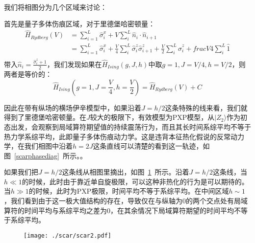 我们将相图分为几个区域来讨论：

首先是量子多体伤痕区域，对于里德堡哈密顿量：
\begin{equation}
\begin{split}
	\hat{H}_{Rydberg}(V) &= \sum_{i=1}^{L} \hat{\sigma}_{i}^{x} + V \sum_{i}^{L} \hat{n}_i\cdot\hat{n}_{i+1} \\
	\quad &= \sum_{i=1}^{L} \hat{\sigma}_{i}^{x} + \frac{V}{4}  \sum_{i}^L \hat{\sigma}_i^z\hat{\sigma}_{i+1}^z + \frac{V}{2} \sum_i^L \hat{\sigma}_i^z  + frac{V}{4} \sum_i^L \hat{1} \\
\end{split}
\end{equation}
带入$\hat{n}_i = \frac{\hat{\sigma}_i^z+1}{2}$，我们发现如果在$\hat{H}_{Ising}(g,J,h)$中取$g=1,J=V/4,h=V/2$，则两者是等价的：
\begin{equation}
\hat{H}_{Ising}(g=1,J=\frac{V}{4},h=\frac{V}{2}) = \hat{H}_{Rydberg}(V) + C
\end{equation}

因此在带有纵场的横场伊辛模型中，如果沿着$J=h/2$这条特殊的线来看，我们就得到了里德堡哈密顿量。在$J$较大的极限下，有效模型为PXP模型，从$|Z_2\rangle$作为初态出发，会观察到局域算符期望值的持续震荡行为，而且其长时间系综平均不等于热力学系综平均，此即量子多体伤痕动力学。这是违背本征热化假说的反常动力学，在我们相图中沿着$h=2J$这条直线可以清楚的看到这一轨迹，如图~\ref{scarphasediag}~所示。。

如果我们把$J=h/2$这条线从相图里摘出，如图~\ref{scar1_2}~所示。沿着$J=h/2$这条线，当$h\ll 1$的时候，此时由于靠近单自旋极限，可以这种非热化的行为是可以期待的。当$h \gg 1$的时候，此时为PXP极限，时间平均不等于系综平均。在中间区域$h\sim 1$，我们看到由于这一极大值结构的存在，导致仅在与纵轴为0的两个交点处有局域算符的时间平均与系综平均之差为0，在其余情况下局域算符期望的时间平均不等于系综平均。

\begin{figure}[h]
\centering
\texttt{[image: ./scar/scar2.pdf]}
\label{scar1_2}
\end{figure}


